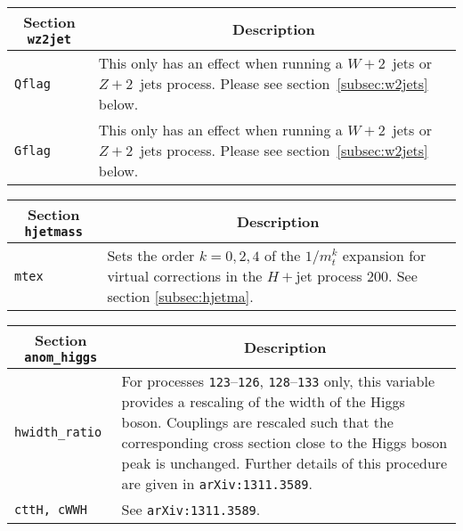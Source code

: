 \clearpage
	\begin{longtable}{p{1.5cm}p{12cm}}
		\toprule
		\multicolumn{1}{c}{{\textbf{Section} \texttt{wz2jet}}} & \multicolumn{1}{c}{{\textbf{Description}}} \\ 
		\midrule
		\texttt{Qflag} &
		This only has an effect when running a
		$W+2$~jets or $Z+2$~jets process. Please see section~\ref{subsec:w2jets}
		below. \\
		\texttt{Gflag} &
		This only has an effect when running a
		$W+2$~jets or $Z+2$~jets process. Please see section~\ref{subsec:w2jets}
		below. \\
		\bottomrule
	\end{longtable}

	\begin{longtable}{p{1.5cm}p{12cm}}
		\toprule
		\multicolumn{1}{c}{{\textbf{Section} \texttt{hjetmass}}} & \multicolumn{1}{c}{{\textbf{Description}}} \\ 
		\midrule
		{\tt mtex} &
		Sets the order $k=0,2,4$ of the $1/m_t^k$ expansion for virtual corrections in the $H+$jet process 200. See 
		section \ref{subsec:hjetma}. \\
		\bottomrule
	\end{longtable}

	\begin{longtable}{p{1.5cm}p{12cm}}
		\toprule
		\multicolumn{1}{c}{{\textbf{Section} \texttt{anom\_higgs}}} & \multicolumn{1}{c}{{\textbf{Description}}} \\ 
		\midrule
		{\tt hwidth\_ratio} & For processes {\tt 123}--{\tt 126}, {\tt 128}--{\tt 133} only,
		this variable provides a rescaling of the width of the Higgs boson.  Couplings are rescaled such that the
		corresponding cross section close to the Higgs boson peak is unchanged.  Further details of this procedure are 
		given in
		{\tt arXiv:1311.3589}. \\
		\texttt{cttH, cWWH} & See {\tt arXiv:1311.3589}. \\
		\bottomrule
	\end{longtable}

